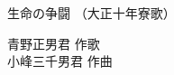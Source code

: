 \documentclass[10pt,b5j]{tarticle} %
\begin{document}
\begin{minipage}[c]{0.7\hsize} %
    \begin{center}
        {\LARGE
            生命の争闘 %
        }
        {\small 
            （大正十年寮歌） %
        }
    \end{center}
\end{minipage}
\begin{minipage}[c]{0.3\hsize} %
    \begin{flushright} %
        青野正男君 作歌\\小峰三千男君 作曲 %
    \end{flushright}
\end{minipage}
\end{document}
